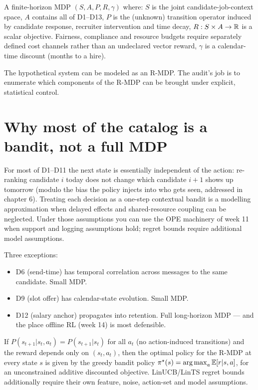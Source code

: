 \documentclass[11pt,oneside]{scrbook}
\begin{document}
\begin{definition}
A finite-horizon MDP $(S, A, P, R, \gamma)$ where:
$S$ is the joint candidate-job-context space,
$A$ contains all of D1--D13,
$P$ is the (unknown) transition operator induced by candidate response,
recruiter intervention and time decay,
$R:S\times A\to\mathbb{R}$ is a scalar objective. Fairness, compliance and resource budgets require separately defined cost channels rather than an undeclared vector reward,
$\gamma$ is a calendar-time discount (months to a hire).
\end{definition}

The hypothetical system can be modeled as an R-MDP. The
audit's job is to enumerate which components of the R-MDP can be brought
under explicit, statistical control.

\section{Why most of the catalog is a bandit, not a full MDP}

For most of D1--D11 the next state is essentially independent of the
action: re-ranking candidate $i$ today does not change which candidate
$i+1$ shows up tomorrow (modulo the bias the policy injects into who
gets seen, addressed in chapter 6). Treating each decision as a one-step
contextual bandit is a modelling approximation when delayed effects and shared-resource coupling can be neglected. Under those assumptions you
can use the OPE machinery of week 11 when support and logging assumptions hold; regret bounds require additional model assumptions.

Three exceptions:

\begin{itemize}
  \item D6 (send-time) has temporal correlation across messages to the
        same candidate. Small MDP.
  \item D9 (slot offer) has calendar-state evolution. Small MDP.
  \item D12 (salary anchor) propagates into retention. Full long-horizon
        MDP --- and the place offline RL (week 14) is most defensible.
\end{itemize}

\begin{theorem}
If $P(s_{t+1}|s_t,a_t) = P(s_{t+1}|s_t)$ for all $a_t$ (no
action-induced transitions) and the reward depends only on $(s_t, a_t)$,
then the optimal policy for the R-MDP at every state $s$ is given by the
greedy bandit policy $\pi^\star(s) = \operatorname*{arg\,max}_a \mathbb{E}[r|s,a]$, for an unconstrained additive discounted objective. LinUCB/LinTS regret bounds additionally require their own feature, noise, action-set and model assumptions.
\end{theorem}
\end{document}
